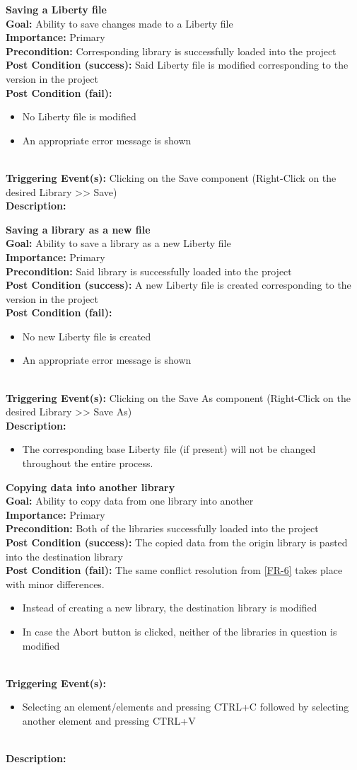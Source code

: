 \documentclass[10pt,a4paper]{report}
\newcommand{\FRDescription}[8]{
    \textbf{#1} \leavevmode \\
    \textbf{Goal: } #2 \leavevmode \\
    \textbf{Importance: } #3 \leavevmode \\
    \textbf{Precondition: } #4 \leavevmode \\
    \textbf{Post Condition (success): } #5 \leavevmode \\
    \textbf{Post Condition (fail): } #6 \leavevmode \\
    \textbf{Triggering Event(s): } #7 \leavevmode \\
    \textbf{Description: } \leavevmode \\ 
    #8}
\begin{document}
\begin{FR}
{\begin{itemize}
    \end{itemize}}
    \item \FRDescription{Saving a Liberty file}
    {Ability to save changes made to a Liberty file}
    {Primary}
    {Corresponding library is successfully loaded into the project}
    {Said Liberty file is modified corresponding to the version in the project}
    {\begin{itemize}
        \item No Liberty file is modified
        \item An appropriate error message is shown
    \end{itemize}}
    {Clicking on the Save component (Right-Click on the desired Library  >> Save)}
    \item \FRDescription{Saving a library as a new file}
    {Ability to save a library as a new Liberty file}
    {Primary}
    {Said library is successfully loaded into the project}
    {A new Liberty file is created corresponding to the version in the project}
    {\begin{itemize}
        \item No new Liberty file is created
        \item An appropriate error message is shown
    \end{itemize}}
    {Clicking on the Save As component (Right-Click on the desired Library  >> Save As)}
    {\begin{itemize}
        \item The corresponding base Liberty file (if present) will not be changed throughout the entire process.
    \end{itemize}}
    \item \FRDescription{Copying data into another library}
    {Ability to copy data from one library into another}
    {Primary}
    {Both of the libraries successfully loaded into the project}
    {The copied data from the origin library is pasted into the destination library}
    {The same conflict resolution from \ref{FR-6} takes place with minor differences.
    \begin{itemize}
        \item Instead of creating a new library, the destination library is modified
        \item In case the Abort button is clicked, neither of the libraries in question is modified
    \end{itemize}}
    {\begin{itemize}
        \item Selecting an element/elements and pressing CTRL+C followed by selecting another element and pressing CTRL+V

\end{itemize}}
\end{FR}
\end{document}
